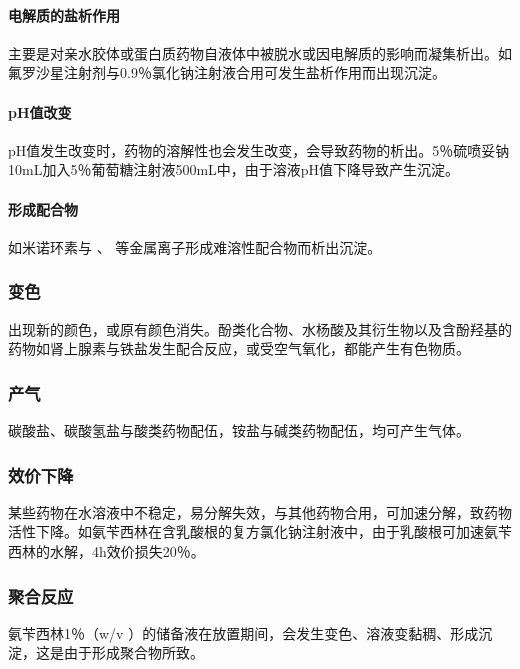 \paragraph{电解质的盐析作用}

主要是对亲水胶体或蛋白质药物自液体中被脱水或因电解质的影响而凝集析出。如氟罗沙星注射剂与0.9％氯化钠注射液合用可发生盐析作用而出现沉淀。
\paragraph{pH值改变}

pH值发生改变时，药物的溶解性也会发生改变，会导致药物的析出。5％硫喷妥钠10mL加入5％葡萄糖注射液500mL中，由于溶液pH值下降导致产生沉淀。
\paragraph{形成配合物}

如米诺环素与 、 等金属离子形成难溶性配合物而析出沉淀。

\subsubsection{变色}

出现新的颜色，或原有颜色消失。酚类化合物、水杨酸及其衍生物以及含酚羟基的药物如肾上腺素与铁盐发生配合反应，或受空气氧化，都能产生有色物质。

\subsubsection{产气}

碳酸盐、碳酸氢盐与酸类药物配伍，铵盐与碱类药物配伍，均可产生气体。

\subsubsection{效价下降}

某些药物在水溶液中不稳定，易分解失效，与其他药物合用，可加速分解，致药物活性下降。如氨苄西林在含乳酸根的复方氯化钠注射液中，由于乳酸根可加速氨苄西林的水解，4h效价损失20％。

\subsubsection{聚合反应}

氨苄西林1％（{w/v}
）的储备液在放置期间，会发生变色、溶液变黏稠、形成沉淀，这是由于形成聚合物所致。

